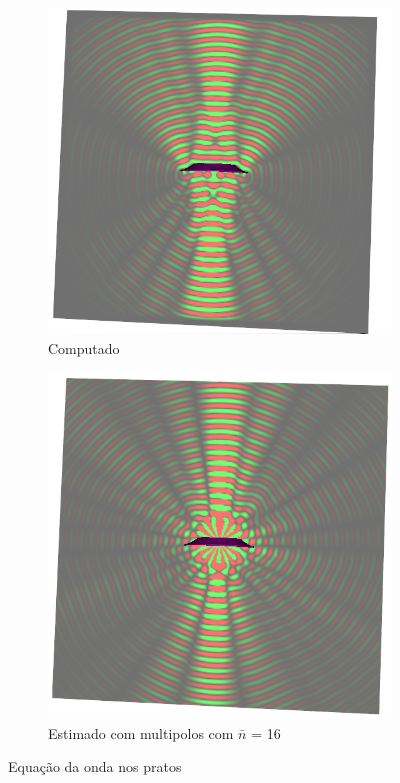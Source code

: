 \begin{figure}[ht]
\centering
\begin{subfigure}{0.5\textwidth}
	\centering
	\includegraphics[width=\textwidth]{algorithm/plate_mode_a.png}
	\caption{Computado}\label{fig:wave_plates_a}
\end{subfigure}%
\begin{subfigure}{0.5\textwidth}
	\centering
	\includegraphics[width=\textwidth]{algorithm/plate_mode_b.png}
	\caption{Estimado com multipolos com $\bar{n}$ = 16}
	\label{fig:wave_plates_b}
\end{subfigure}
\caption[Equação da onda nos pratos]{Equação da onda nos pratos}
\label{fig:wave_plates}
\end{figure}
